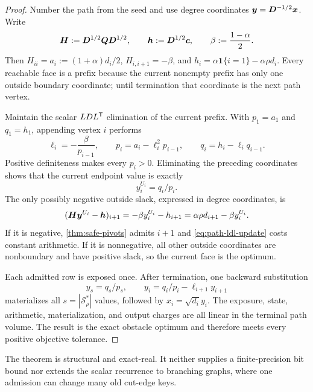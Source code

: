 \begin{proof}
Number the path from the seed and use degree coordinates
$\bm{y}=\bm{D}^{-1/2}\bm{x}$.  Write
\begin{equation}
 \bm{H}:=\bm{D}^{1/2}\bm{Q}\bm{D}^{1/2},
 \qquad
 \bm{h}:=\bm{D}^{1/2}\bm{c},
 \qquad
 \beta:=\frac{1-\alpha}{2}.
 \label{eq:path-degree-system}
\end{equation}
Then $H_{ii}=a_i:=(1+\alpha)d_i/2$,
$H_{i,i+1}=-\beta$, and
$h_i=\alpha\mathbf 1\{i=1\}-\alpha\rho d_i$.
Every reachable face is a prefix because the current nonempty prefix has only
one outside boundary coordinate; until termination that coordinate is the
next path vertex.

Maintain the scalar $LDL^{\mathsf{T}}$ elimination of the current prefix.  With
$p_1=a_1$ and $q_1=h_1$, appending vertex $i$ performs
\begin{equation}
 \ell_i=-\frac{\beta}{p_{i-1}},
 \qquad
 p_i=a_i-\ell_i^2p_{i-1},
 \qquad
 q_i=h_i-\ell_iq_{i-1}.
 \label{eq:path-ldl-update}
\end{equation}
Positive definiteness makes every $p_i>0$.  Eliminating the preceding
coordinates shows that the current endpoint value is exactly
\begin{equation}
 y_i^{U_i}=q_i/p_i.
 \label{eq:path-endpoint-value}
\end{equation}
The only possibly negative outside slack, expressed in degree coordinates,
is
\begin{equation}
 (\bm{H}\bm{y}^{U_i}-\bm{h})_{i+1}
 =-\beta y_i^{U_i}-h_{i+1}
 =\alpha\rho d_{i+1}-\beta y_i^{U_i}.
 \label{eq:path-next-slack}
\end{equation}
If it is negative, \cref{thm:safe-pivots} admits $i+1$ and
\cref{eq:path-ldl-update} costs constant arithmetic.  If it is nonnegative,
all other outside coordinates are nonboundary and have positive slack, so the
current face is the optimum.

Each admitted row is exposed once.  After termination, one backward
substitution
\[
 y_s=q_s/p_s,
 \qquad
 y_i=q_i/p_i-\ell_{i+1}y_{i+1}
\]
materializes all $s=|\mathcal S_\rho^*|$ values, followed by
$x_i=\sqrt{d_i}y_i$.  The exposure, state, arithmetic, materialization, and
output charges are all linear in the terminal path volume.  The result is the
exact obstacle optimum and therefore meets every positive objective tolerance.
\end{proof}

The theorem is structural and exact-real.  It neither supplies a
finite-precision bit bound nor extends the scalar recurrence to branching
graphs, where one admission can change many old cut-edge keys.

